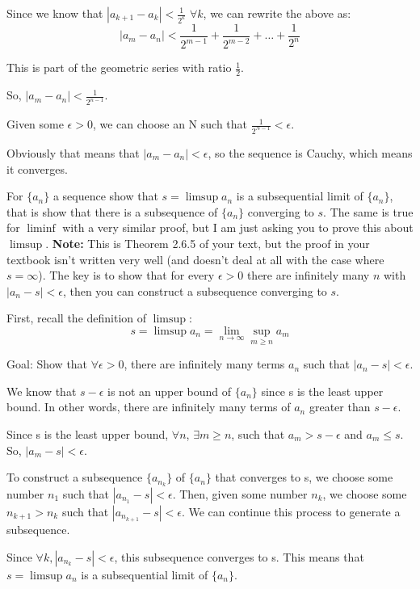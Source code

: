 \documentclass[answers]{exam}
\theoremstyle{remark}
\theoremstyle{definition}
\begin{document}
\begin{questions}
\begin{solution}
Since we know that $|a_{k+1} - a_k| < \frac{1}{2^k}$ $\forall k$,
we can rewrite the above as:
\[|a_m - a_n| < \frac{1}{2^{m-1}} + \frac{1}{2^{m-2}} + \dots + \frac{1}{2^n}\]

This is part of the geometric series with ratio $\frac{1}{2}$.

So, $|a_m - a_n| < \frac{1}{2^{n-1}}$.

Given some $\epsilon > 0$, we can choose an N such that $\frac{1}{2^{N-1}} < \epsilon$.

Obviously that means that $|a_m - a_n| < \epsilon$,
so the sequence is Cauchy, which means it converges.


\end{solution}


\question For $\{a_n\}$ a sequence show  that  $s=\limsup a_n$ is a subsequential limit of $\{a_n\}$, that is show that there is a subsequence of $\{a_n\}$ converging to $s$. The same is true for $\liminf$ with a very similar proof, but I am just asking you to prove this about $\limsup$. \textbf{Note:} This is Theorem 2.6.5 of your text, but the proof in your textbook isn't written very well (and doesn't deal at all with the case where $s=\infty$). The key is to show that for every $\epsilon>0$ there are infinitely many $n$ with $|a_n -s | < \epsilon$, then you can construct a subsequence converging to $s$.
\begin{solution}

First, recall the definition of $\limsup$:
\[s = \limsup a_n = \lim_{n \to \infty} \sup_{m \geq n} a_m\]

Goal: Show that $\forall \epsilon > 0$, there are infinitely many terms
$a_n$ such that $|a_n - s| < \epsilon$.

We know that $s - \epsilon$ is not an upper bound of $\{a_n\}$ since
s is the least upper bound. In other words, there are infinitely many terms
of $a_n$ greater than $s - \epsilon$.

Since s is the least upper bound, $\forall n$, $\exists m \geq n$,
such that $a_m > s - \epsilon$ and $a_m \leq s$.
So, $|a_m - s| < \epsilon$.

To construct a subsequence $\{a_{n_k}\}$ of $\{a_n\}$ that converges to s,
we choose some number $n_1$ such that $|a_{n_1} - s| < \epsilon$.
Then, given some number $n_k$, we choose some $n_{k+1} > n_k$
such that $|a_{n_{k+1}} - s| < \epsilon$. We can continue this process
to generate a subsequence.

Since $\forall k, |a_{n_k} - s| < \epsilon$, this subsequence converges to s.
This means that $s = \limsup a_n$ is a subsequential limit of $\{a_n\}$.



\end{solution}
\end{questions}
\end{document}
